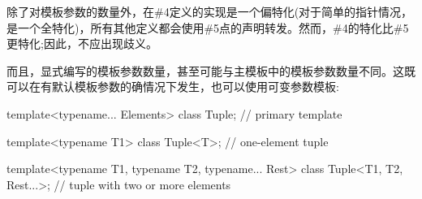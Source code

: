 除了对模板参数的数量外，在\#4定义的实现是一个偏特化(对于简单的指针情况，是一个全特化)，所有其他定义都会使用\#5点的声明转发。然而，\#4的特化比\#5更特化;因此，不应出现歧义。

而且，显式编写的模板参数数量，甚至可能与主模板中的模板参数数量不同。这既可以在有默认模板参数的确情况下发生，也可以使用可变参数模板:

\begin{cpp}
template<typename... Elements>
class Tuple; // primary template

template<typename T1>
class Tuple<T>; // one-element tuple

template<typename T1, typename T2, typename... Rest>
class Tuple<T1, T2, Rest...>; // tuple with two or more elements
\end{cpp}


















